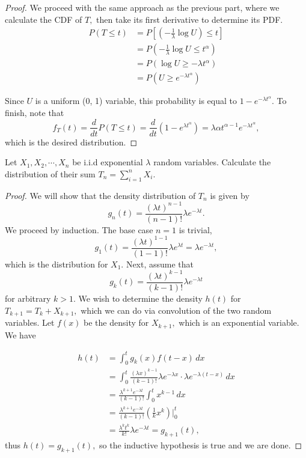 \documentclass{article}
\begin{document}
\begin{enumerate}
\begin{enumerate}[(a)]
				\begin{proof}
					We proceed with the same approach as the previous part, where we calculate the CDF of $T,$ then take its first derivative to determine its PDF.
					\begin{align*}
						P(T\le t) &= P\left[ \left( -\frac{1}{\lambda}\log U \right) \le t \right] \\
						&= P\left( -\frac{1}{\lambda}\log U \le t^\alpha \right) \\
						&= P\left( \log U\ge-\lambda t^\alpha \right) \\
						&= P\left( U\ge e^{-\lambda t^\alpha} \right)
					\end{align*}

					Since $U$ is a uniform (0, 1) variable, this probability is equal to $1-e^{-\lambda t^\alpha}.$ To finish, note that \[f_T(t)=\frac{d}{dt}P(T\le t) = \frac{d}{dt}\left( 1-e^{\lambda t^\alpha} \right) = 	\lambda\alpha t^{\alpha-1}e^{-\lambda t^{\alpha}}, \] which is the desired distribution.		
				
				\end{proof}

				\ii Let $X_1, X_2, \cdots, X_n$ be i.i.d exponential $\lambda$ random variables. Calculate the distribution of their sum $T_n=\sum_{i=1}^n X_i.$

				\begin{proof}
					We will show that the density distribution of $T_n$ is given by \[g_n(t) = \frac{(\lambda t)^{n-1}}{(n-1)!}\lambda e^{-\lambda t}. \] We proceed by induction. The base case $n=1$ is trivial, \[g_1(t)=\frac{(\lambda t)^{1-1}}{(1-1)!}\lambda e^{\lambda t} = \lambda e^{-\lambda t}, \] which is the distribution for $X_1.$ Next, assume that \[g_k(t) =  \frac{(\lambda t)^{k-1}}{(k-1)!}\lambda e^{-\lambda t}\] for arbitrary $k>1.$ We wish to determine the density $h(t)$ for $T_{k+1}=T_k+X_{k+1},$ which we can do via convolution of the two random variables. Let $f(x)$ be the density for $X_{k+1},$ which is an exponential variable. We have  
					
					\begin{align*}
						h(t) &= \int_0^t g_k(x) f(t-x)\, dx \\
						&= \int_0^t \frac{(\lambda x)^{k-1}}{(k-1)!}\lambda e^{-\lambda x} \cdot \lambda e^{-\lambda(t-x)}\, dx \\
						&= \frac{\lambda^{k+1}e^{-\lambda t}}{(k-1)!}\int_0^t x^{k-1}\, dx \\
						&= \frac{\lambda^{k+1}e^{-\lambda t}}{(k-1)!}\left( \frac{1}{k}x^k \right)\Bigg|_0^t \\
						&= \frac{\lambda^k t^k}{k!}\lambda e^{-\lambda t} = g_{k+1}(t),
					\end{align*} thus $h(t)=g_{k+1}(t),$ so the inductive hypothesis is true and we are done.


\end{proof}
\end{enumerate}
\end{enumerate}
\end{document}
